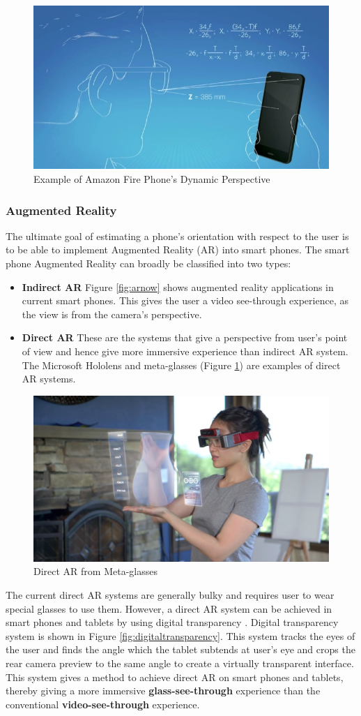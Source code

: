 \documentclass[12pt,twocolumn,letterpaper]{article}
\begin{document}
\begin{figure}[!htbp]
\centering
\includegraphics[height=35 mm]{dp.jpg}
\caption{Example of Amazon Fire Phone's Dynamic Perspective}
\end{figure}

\subsubsection{Augmented Reality}

The ultimate goal of estimating a phone's orientation with respect to the user is to be able to implement Augmented Reality (AR) into smart phones. The smart phone Augmented Reality can broadly be classified into two types:
\begin{itemize}
\item \textbf{Indirect AR} Figure \ref{fig:arnow} shows augmented reality applications in current smart phones. This gives the user a video see-through experience, as the view is from the camera's perspective.
\item \textbf{Direct AR} These are the systems that give a perspective from user's point of view and hence give more immersive experience than indirect AR system. The Microsoft Hololens and meta-glasses (Figure \ref{fig:directar}) are examples of direct AR systems. 
\end{itemize}


\begin{figure}[!htbp]
\centering
\includegraphics[height=30 mm]{mata}
\caption{Direct AR from Meta-glasses}
\label{fig:directar}
\end{figure}

The current direct AR systems are generally bulky and requires user to wear special glasses to use them. However, a direct AR system can be achieved in smart phones and tablets by using digital transparency \cite{jai}. Digital transparency system is shown in Figure \ref{fig:digitaltransparency}. This system tracks the eyes of the user and finds the angle which the tablet subtends at user's eye and crops the rear camera preview to the same angle to create a virtually transparent interface. This system gives a method to achieve direct AR on smart phones and tablets, thereby giving a more immersive \textbf{glass-see-through} experience than the conventional \textbf{video-see-through} experience.
\end{document}
